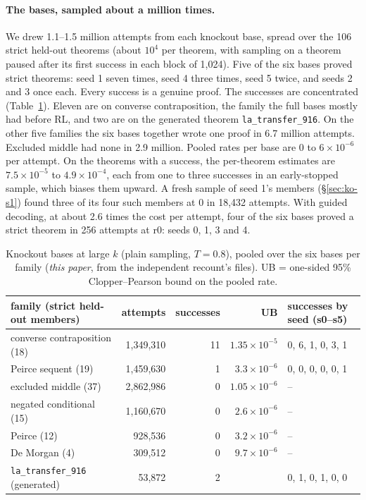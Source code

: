 \paragraph{The bases, sampled about a million times.} We drew 1.1--1.5 million attempts from each knockout base, spread
over the 106 strict held-out theorems (about $10^4$ per theorem, with sampling on a theorem paused after its first
success in each block of 1,024). Five of the six bases proved strict theorems: seed 1 seven times, seed 4 three times,
seed 5 twice, and seeds 2 and 3 once each. Every success is a genuine \sig{} proof. The successes are concentrated
(Table~\ref{tab:fambase}). Eleven are on converse contraposition, the family the full bases mostly had before RL, and
two are on the generated theorem \texttt{la\_transfer\_916}. On the other five families the six bases together wrote one
\sig{} proof in 6.7 million attempts. Excluded middle had none in 2.9 million. Pooled rates per base are 0 to
$6\times10^{-6}$ per attempt. On the theorems with a success, the per-theorem estimates are $7.5\times10^{-5}$ to
$4.9\times10^{-4}$, each from one to three successes in an early-stopped sample, which biases them upward. A fresh
sample of seed 1's members (\S\ref{sec:ko-s1}) found three of its four such members at 0 in 18,432 attempts. With guided decoding, at about 2.6 times the cost per attempt,
four of the six bases proved a strict theorem in 256 attempts at r0: seeds 0, 1, 3 and 4.

\begin{table}[t]
\centering\small
\caption{Knockout bases at large $k$ (plain sampling, $T=0.8$), pooled over the six bases per family (\emph{this
paper}, from the independent recount's files). UB = one-sided 95\% Clopper--Pearson bound on the pooled rate.}
\label{tab:fambase}
\begin{tabular}{lrrrl}
\toprule
family (strict held-out members) & attempts & successes & UB & successes by seed (s0--s5) \\
\midrule
converse contraposition (18) & 1,349,310 & 11 & $1.35\times10^{-5}$ & 0, 6, 1, 0, 3, 1 \\
Peirce sequent (19) & 1,459,630 & 1 & $3.3\times10^{-6}$ & 0, 0, 0, 0, 0, 1 \\
excluded middle (37) & 2,862,986 & 0 & $1.05\times10^{-6}$ & -- \\
negated conditional (15) & 1,160,670 & 0 & $2.6\times10^{-6}$ & -- \\
Peirce (12) & 928,536 & 0 & $3.2\times10^{-6}$ & -- \\
De Morgan (4) & 309,512 & 0 & $9.7\times10^{-6}$ & -- \\
\texttt{la\_transfer\_916} (generated) & 53,872 & 2 & & 0, 1, 0, 1, 0, 0 \\
\bottomrule
\end{tabular}
\end{table}

